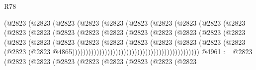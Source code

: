 \begin{lexlean}{R78}
\begin{coremodule}
                                  (@2823
                                    (@2823
                                      (@2823
                                        (@2823
                                          (@2823
                                            (@2823
                                              (@2823
                                                (@2823
                                                  (@2823
                                                    (@2823
                                                      (@2823
                                                        (@2823
                                                          (@2823
                                                            (@2823
                                                              (@2823
                                                                (@2823
                                                                  (@2823
                                                                    (@2823
                                                                      (@2823
                                                                        (@2823
                                                                          (@2823
                                                                            (@2823
                                                                              (@2823
                                                                                (@2823
                                                                                  (@2823
                                                                                    (@2823
                                                                                      (@2823
                                                                                        (@2823
                                                                                          (@2823
                                                                                            (@2823
                                                                                              (@2823
                                                                                                (@2823
                                                                                                  @4865)))))))))))))))))))))))))))))))))))))))))))))))
@4961 := @2823
    (@2823
      (@2823
        (@2823
          (@2823
            (@2823
              (@2823
                (@2823
                  (@2823

\end{coremodule}
\end{lexlean}
